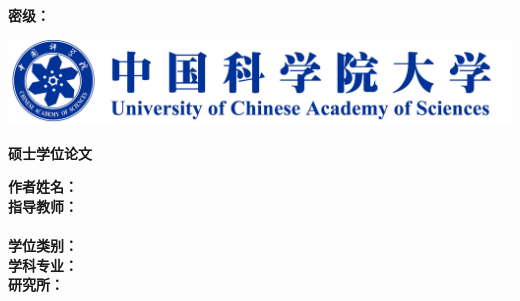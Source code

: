 
\thispagestyle{empty}
\begin{flushright}
    \sihao\songti\textbf{密级：\uline{\hspace{3.5em}}}
    \vspace{1.5cm}
\end{flushright}
\begin{center}
   \includegraphics[width=\textwidth]{images/logo.pdf}
\end{center}
\vspace{1cm}
\centerline{\heiti\yihao\textbf{硕士学位论文}}

\vspace{1.5cm}

{\hspace{16mm}\songti\xiaoer\bfseries 
  \hspace{2mm} \begin{minipage}[t]{98mm}\linespread{1.1}\uline{\ioatitlec}\end{minipage}}

\vspace{2.5cm}

\begin{tabbing}
  \hspace{0mm}\songti\sihao\textbf{作者姓名：}\=\uline{\makebox[12cm]{\songti\sihao\bfseries\ioaauthornamec}}\\[2mm]
\hspace{0mm}\songti\sihao\textbf{指导教师：}\>\uline{\makebox[12cm]{\songti\sihao\bfseries\ioamentorf}}\\[2mm]
\hspace{29mm}                                 \>\uline{\makebox[12cm]{\songti\sihao\bfseries\ioamentors}}\\[2mm]
\hspace{0mm}\songti\sihao\textbf{学位类别：}\>\uline{\makebox[12cm]{\songti\sihao\bfseries\ioadegreec}}\\[2mm]
\hspace{0mm}\songti\sihao\textbf{学科专业：}\>\uline{\makebox[12cm]{\songti\sihao\bfseries\ioamajorc}}\\[2mm]
\hspace{0mm}\songti\sihao\textbf{研究所：}\>\uline{\makebox[12cm]{\songti\sihao\bfseries\ioadepartmentc}}\\[2mm]
\end{tabbing}
\vspace{1cm}
\begin{center}
  \makebox{\songti\sihao\textbf{\ioadatec}}
\end{center}


